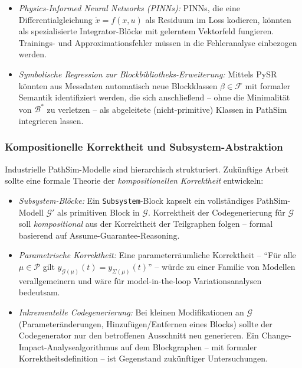 ﻿\documentclass[12pt,a4paper]{article}
\theoremstyle{definition}
\begin{document}
\begin{itemize}
  \item \emph{Physics-Informed Neural Networks (PINNs):} PINNs, die
        eine Differentialgleichung $\dot{x} = f(x,u)$ als Residuum im
        Loss kodieren, könnten als spezialisierte Integrator-Blöcke
        mit gelerntem Vektorfeld fungieren. Trainings- und
        Approximationsfehler müssen in die Fehleranalyse einbezogen
        werden.

  \item \emph{Symbolische Regression zur Blockbibliotheks-Erweiterung:}
        Mittels PySR könnten aus Messdaten automatisch neue Blockklassen
        $\beta \in \mathcal{F}$ mit formaler Semantik identifiziert
        werden, die sich anschließend -- ohne die Minimalität von
        $\mathcal{B}^*$ zu verletzen -- als abgeleitete (nicht-primitive)
        Klassen in PathSim integrieren lassen.
\end{itemize}

\subsubsection{Kompositionelle Korrektheit und Subsystem-Abstraktion}

Industrielle PathSim-Modelle sind hierarchisch strukturiert.
Zukünftige Arbeit sollte eine formale Theorie der
\emph{kompositionellen Korrektheit} entwickeln:

\begin{itemize}
  \item \emph{Subsystem-Blöcke:} Ein \texttt{Subsystem}-Block kapselt
        ein vollständiges PathSim-Modell $\mathcal{G}'$ als primitiven
        Block in $\mathcal{G}$. Korrektheit der Codegenerierung für
        $\mathcal{G}$ soll \emph{kompositional} aus der Korrektheit der
        Teilgraphen folgen -- formal basierend auf
        Assume-Guarantee-Reasoning.

  \item \emph{Parametrische Korrektheit:} Eine parameterräumliche
        Korrektheit -- ``Für alle $\mu \in \mathcal{P}$ gilt
        $y_{\mathcal{G}(\mu)}(t) = y_{\Sigma(\mu)}(t)$'' -- würde
         zu einer Familie von Modellen verallgemeinern
        und wäre für model-in-the-loop Variationsanalysen bedeutsam.

  \item \emph{Inkrementelle Codegenerierung:} Bei kleinen
        Modifikationen an $\mathcal{G}$ (Parameteränderungen,
        Hinzufügen/Entfernen eines Blocks) sollte der Codegenerator
        nur den betroffenen Ausschnitt neu generieren. Ein
        Change-Impact-Analysealgorithmus auf dem Blockgraphen -- mit
        formaler Korrektheitsdefinition -- ist Gegenstand zukünftiger
        Untersuchungen.
\end{itemize}
\end{document}
